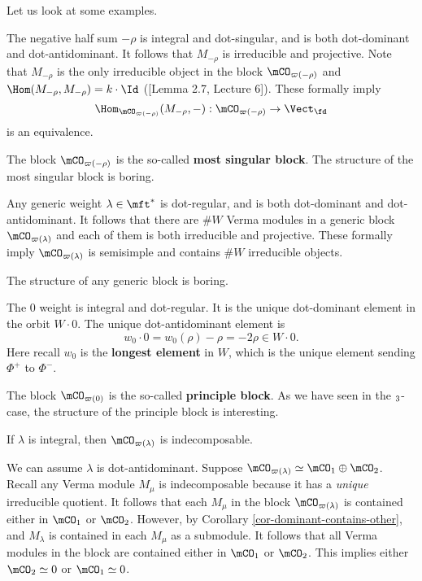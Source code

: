  	Let us look at some examples.

	\begin{exam}
		The negative half sum $-\rho$ is integral and dot-singular, and is both dot-dominant and dot-antidominant. It follows that $M_{-\rho}$ is irreducible and projective. Note that $M_{-\rho}$ is the only irreducible object in the block $\mCO_{\varpi(-\rho)}$ and $\Hom(M_{-\rho},M_{-\rho}) = k\cdot\Id$ ([Lemma 2.7, Lecture 6]). These formally imply
		\[
			\Hom_{\mCO_{\varpi(-\rho)}}(M_{-\rho},-): \mCO_{\varpi(-\rho)} \to \Vect_{\fd}
		\]
		is an equivalence.

		The block $\mCO_{\varpi(-\rho)}$ is the so-called \textbf{most singular block}. The structure of the most singular block is boring.
	\end{exam}

	\begin{rem}
		Any generic weight $\lambda \in \mft^*$ is dot-regular, and is both dot-dominant and dot-antidominant. It follows that there are $\# W$ Verma modules in a generic block $\mCO_{\varpi(\lambda)}$ and each of them is both irreducible and projective. These formally imply $\mCO_{\varpi(\lambda)}$ is semisimple and contains $\# W$ irreducible objects.

		The structure of any generic block is boring.
	\end{rem}

	
	\begin{rem}
		The $0$ weight is integral and dot-regular. It is the unique dot-dominant element in the orbit $W\cdot 0$. The unique dot-antidominant element is
		\[
			w_0\cdot 0 = w_0(\rho) -\rho = -2\rho \in W\cdot 0.
		\]
		Here recall $w_0$ is the \textbf{longest element} in $W$, which is the unique element sending $\Phi^+$ to $\Phi^-$.

		The block $\mCO_{\varpi(0)}$ is the so-called \textbf{principle block}. As we have seen in the $\sl_3$-case, the structure of the principle block is interesting.
	\end{rem}

	\begin{prop}
		If $\lambda$ is integral, then $\mCO_{\varpi(\lambda)}$ is indecomposable.
	\end{prop}

	\proof
		We can assume $\lambda$ is dot-antidominant. Suppose $\mCO_{\varpi(\lambda)}\simeq \mCO_1\oplus \mCO_2$. Recall any Verma module $M_\mu$ is indecomposable because it has a \emph{unique} irreducible quotient. It follows that each $M_\mu$ in the block $\mCO_{\varpi(\lambda)}$ is contained either in $\mCO_1$ or $\mCO_2$. However, by Corollary \ref{cor-dominant-contains-other}, and $M_\lambda$ is contained in each $M_\mu$ as a submodule. It follows that all Verma modules in the block are contained either in $\mCO_1$ or $\mCO_2$. This implies either $\mCO_2\simeq 0$ or $\mCO_1\simeq 0$.

